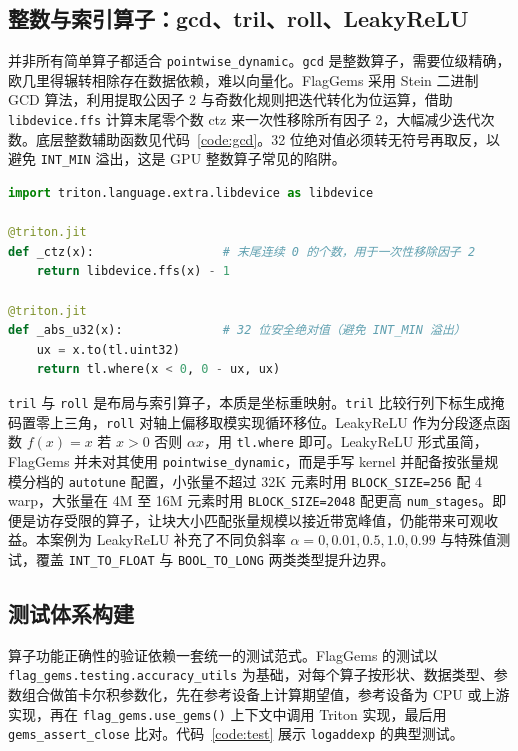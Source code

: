 \subsection{整数与索引算子：gcd、tril、roll、LeakyReLU}
并非所有简单算子都适合 \texttt{pointwise\_dynamic}。\texttt{gcd} 是整数算子，需要位级精确，欧几里得辗转相除存在数据依赖，难以向量化。FlagGems 采用 Stein 二进制 GCD 算法，利用提取公因子 2 与奇数化规则把迭代转化为位运算，借助 \texttt{libdevice.ffs} 计算末尾零个数 ctz 来一次性移除所有因子 2，大幅减少迭代次数。底层整数辅助函数见代码~\ref{code:gcd}。32 位绝对值必须转无符号再取反，以避免 \texttt{INT\_MIN} 溢出，这是 GPU 整数算子常见的陷阱。

\begin{lstlisting}[language=Python, caption={gcd 的 Stein 算法底层辅助函数（code/ops/gcd.py，节选）}, label={code:gcd}]
import triton.language.extra.libdevice as libdevice

@triton.jit
def _ctz(x):                  # 末尾连续 0 的个数，用于一次性移除因子 2
    return libdevice.ffs(x) - 1

@triton.jit
def _abs_u32(x):              # 32 位安全绝对值（避免 INT_MIN 溢出）
    ux = x.to(tl.uint32)
    return tl.where(x < 0, 0 - ux, ux)
\end{lstlisting}

\texttt{tril} 与 \texttt{roll} 是布局与索引算子，本质是坐标重映射。\texttt{tril} 比较行列下标生成掩码置零上三角，\texttt{roll} 对轴上偏移取模实现循环移位。LeakyReLU 作为分段逐点函数 $f(x)=x$ 若 $x>0$ 否则 $\alpha x$，用 \texttt{tl.where} 即可。LeakyReLU 形式虽简，FlagGems 并未对其使用 \texttt{pointwise\_dynamic}，而是手写 kernel 并配备按张量规模分档的 \texttt{autotune} 配置，小张量不超过 32K 元素时用 \texttt{BLOCK\_SIZE=256} 配 4 warp，大张量在 4M 至 16M 元素时用 \texttt{BLOCK\_SIZE=2048} 配更高 \texttt{num\_stages}。即便是访存受限的算子，让块大小匹配张量规模以接近带宽峰值，仍能带来可观收益。本案例为 LeakyReLU 补充了不同负斜率 $\alpha=0, 0.01, 0.5, 1.0, 0.99$ 与特殊值测试，覆盖 \texttt{INT\_TO\_FLOAT} 与 \texttt{BOOL\_TO\_LONG} 两类类型提升边界。

\subsection{测试体系构建}
算子功能正确性的验证依赖一套统一的测试范式。FlagGems 的测试以 \texttt{flag\_gems.testing.accuracy\_utils} 为基础，对每个算子按形状、数据类型、参数组合做笛卡尔积参数化，先在参考设备上计算期望值，参考设备为 CPU 或上游实现，再在 \texttt{flag\_gems.use\_gems()} 上下文中调用 Triton 实现，最后用 \texttt{gems\_assert\_close} 比对。代码~\ref{code:test} 展示 \texttt{logaddexp} 的典型测试。

